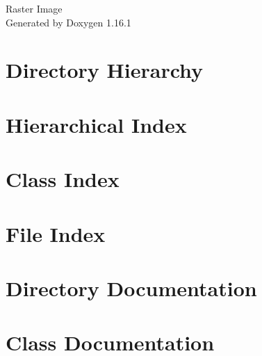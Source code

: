 \documentclass[twoside]{book}
\newcommand{\+}{\discretionary{\mbox{\scriptsize$\hookleftarrow$}}{}{}}
\newcommand{\clearemptydoublepage}{%
    \newpage{\pagestyle{empty}\cleardoublepage}%
  }
\begin{document}
  \raggedbottom
    \hypersetup{pageanchor=false,
                bookmarksnumbered=true,
                pdfencoding=unicode
               }
  \begin{titlepage}
  \vspace*{7cm}
  \begin{center}%
  {\Large Raster Image}\\
  \vspace*{1cm}
  {\large Generated by Doxygen 1.16.1}\\
  \end{center}
  \end{titlepage}
  \clearemptydoublepage
  \tableofcontents
  \clearemptydoublepage
  \hypersetup{pageanchor=true}
\chapter{Directory Hierarchy}

\chapter{Hierarchical Index}

\chapter{Class Index}

\chapter{File Index}

\chapter{Directory Documentation}










\chapter{Class Documentation}










\end{document}
